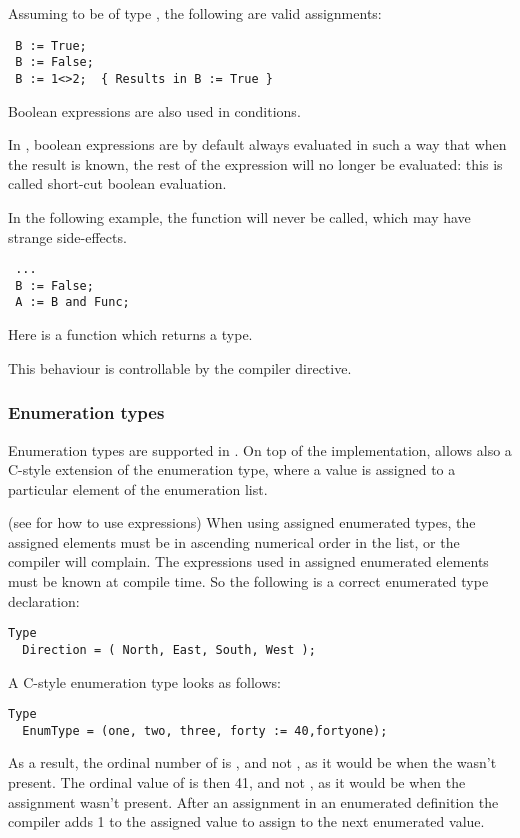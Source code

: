 Assuming  to be of type , the following are valid
assignments:
\begin{verbatim}
 B := True;
 B := False;
 B := 1<>2;  { Results in B := True }
\end{verbatim}
Boolean expressions are also used in conditions.

\begin{remark}
In \fpc, boolean expressions are by default always evaluated in such a
way that when the result is known, the rest of the expression will no longer
be evaluated: this is called short-cut boolean evaluation. 

In the following example, the function  will never be called, 
which may have strange side-effects.
\begin{verbatim}
 ...
 B := False;
 A := B and Func;
\end{verbatim}
Here  is a function which returns a  type.

This behaviour is controllable by the  compiler directive.
\end{remark}

\subsubsection{Enumeration types}
Enumeration types are supported in \fpc. On top of the \tp
implementation, \fpc allows also a C-style extension of the
enumeration type, where a value is assigned to a particular element of
the enumeration list.

(see  for how to use expressions)
When using assigned enumerated types, the assigned elements must be in
ascending numerical order in the list, or the compiler will complain.
The expressions used in assigned enumerated elements must be known at
compile time.
So the following is a correct enumerated type declaration:
\begin{verbatim}
Type
  Direction = ( North, East, South, West );
\end{verbatim}
A C-style enumeration type looks as follows:
\begin{verbatim}
Type
  EnumType = (one, two, three, forty := 40,fortyone);
\end{verbatim}
As a result, the ordinal number of  is , and not ,
as it would be when the  wasn't present.
The ordinal value of  is then {41}, and not , as it
would be when the assignment wasn't present. After an assignment in an
enumerated definition the compiler adds 1 to the assigned value to assign to
the next enumerated value.

